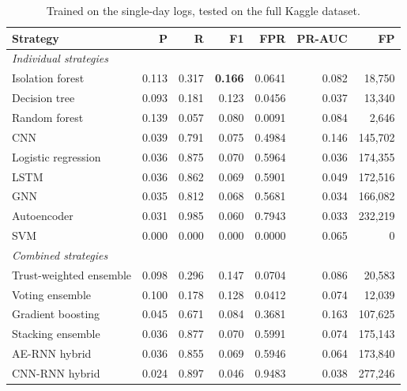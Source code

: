 \begin{table}[H]
\centering
\small
\begin{tabular}{lrrrrrr}
\toprule
Strategy & P & R & F1 & FPR & PR-AUC & FP \\
\midrule
\multicolumn{7}{l}{\textit{Individual strategies}} \\
Isolation forest & 0.113 & 0.317 & \textbf{0.166} & 0.0641 & 0.082 & 18,750 \\
Decision tree & 0.093 & 0.181 & 0.123 & 0.0456 & 0.037 & 13,340 \\
Random forest & 0.139 & 0.057 & 0.080 & 0.0091 & 0.084 & 2,646 \\
CNN & 0.039 & 0.791 & 0.075 & 0.4984 & 0.146 & 145,702 \\
Logistic regression & 0.036 & 0.875 & 0.070 & 0.5964 & 0.036 & 174,355 \\
LSTM & 0.036 & 0.862 & 0.069 & 0.5901 & 0.049 & 172,516 \\
GNN & 0.035 & 0.812 & 0.068 & 0.5681 & 0.034 & 166,082 \\
Autoencoder & 0.031 & 0.985 & 0.060 & 0.7943 & 0.033 & 232,219 \\
SVM & 0.000 & 0.000 & 0.000 & 0.0000 & 0.065 & 0 \\
\midrule
\multicolumn{7}{l}{\textit{Combined strategies}} \\
Trust-weighted ensemble & 0.098 & 0.296 & 0.147 & 0.0704 & 0.086 & 20,583 \\
Voting ensemble & 0.100 & 0.178 & 0.128 & 0.0412 & 0.074 & 12,039 \\
Gradient boosting & 0.045 & 0.671 & 0.084 & 0.3681 & 0.163 & 107,625 \\
Stacking ensemble & 0.036 & 0.877 & 0.070 & 0.5991 & 0.074 & 175,143 \\
AE-RNN hybrid & 0.036 & 0.855 & 0.069 & 0.5946 & 0.064 & 173,840 \\
CNN-RNN hybrid & 0.024 & 0.897 & 0.046 & 0.9483 & 0.038 & 277,246 \\
\bottomrule
\end{tabular}
\caption{Trained on the single-day logs, tested on the full Kaggle dataset.}
\label{tab:generalise-single-day}
\end{table}
